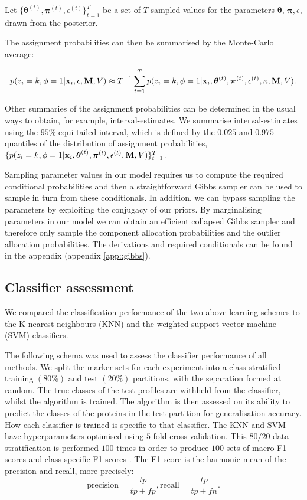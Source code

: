\documentclass[12pt,english]{article}\usepackage[]{graphicx}\usepackage[]{color}
\begin{document}
Let
$\{\boldsymbol{\theta}^{(t)}, \boldsymbol{\pi}^{(t)},
\epsilon^{(t)}\}_{t=1}^T$ be a set of $T$ sampled values for the
parameters $\boldsymbol{\theta}$, $\boldsymbol{\pi}, \epsilon$, drawn
from the posterior.


The assignment probabilities can then be summarised by the Monte-Carlo
average:

\[p(z_i = k, \phi = 1 | {\bf x}_i, \epsilon, {\bf M}, V) \approx T^{-1}\sum_{t=1}^{T}p(z_i = k, \phi = 1 | {\bf x}_i, \boldsymbol{\theta}^{(t)}, \boldsymbol{\pi}^{(t)} , \epsilon^{(t)}, \kappa, {\bf M}, V).\]

Other summaries of the assignment probabilities can be determined in
the usual ways to obtain, for example, interval-estimates. We
summarise interval-estimates using the $95\%$ equi-tailed interval,
which is defined by the $0.025$ and $0.975$ quantiles of the
distribution of assignment probabilities,
$\{p(z_i = k, \phi = 1 | {\bf x}_i, \boldsymbol{\theta}^{(t)},
\boldsymbol{\pi}^{(t)} , \epsilon^{(t)}, {\bf M}, V) \}_{t=1}^T$.

Sampling parameter values in our model requires us to compute the
required conditional probabilities and then a straightforward Gibbs
sampler can be used to sample in turn from these conditionals. In
addition, we can bypass sampling the parameters by exploiting the
conjugacy of our priors. By marginalising parameters in our model we
can obtain an efficient collapsed Gibbs sampler and therefore only
sample the component allocation probabilities and the outlier
allocation probabilities. The derivations and required conditionals
can be found in the appendix (appendix \ref{app::gibbs}).

\subsection{Classifier assessment}\label{section::assessment}

We compared the classification performance of the two
above learning schemes to the K-nearest neighbours (KNN) and the
weighted support vector machine (SVM) classifiers.

The following schema was used to assess the classifier performance of
all methods. We split the marker sets for each experiment into a
class-stratified training $(80\%)$ and test $(20\%)$ partitions, with
the separation formed at random. The true classes of the test profiles
are withheld from the classifier, whilst the algorithm is trained. The
algorithm is then assessed on its ability to predict the classes of
the proteins in the test partition for generalisation accuracy. How
each classifier is trained is specific to that classifier.  The KNN
and SVM have hyperparameters optimised using $5$-fold
cross-validation. This $80/20$ data stratification is performed $100$
times in order to produce $100$ sets of macro-F1 \citep{He::2009}
scores and class specific F1 scores \citep{Breckels:2016}. The F1
score is the harmonic mean of the precision and recall, more
precisely:
\[\text{precision}=\frac{tp}{tp+fp}, \text{recall} = \frac{tp}{tp+fn}.\]
\end{document}
